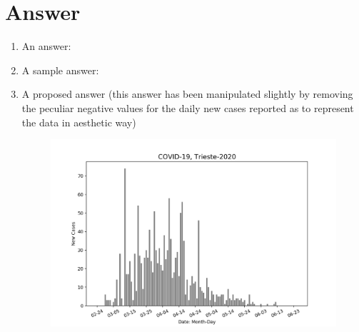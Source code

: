 \documentclass[10pt,a4paper]{article}
\begin{document}
\section{Answer}
\begin{enumerate}
\item An answer: \\  %

\item A sample answer: \\

\item A proposed answer (this answer has been manipulated slightly by removing the peculiar negative values for the daily new cases reported  as to represent the data in aesthetic way)


\begin{figure}[h]\centering

\includegraphics[width=1.0\textwidth]{daily_cases_trieste.png}
\end{figure}

\end{enumerate}








\end{document}
